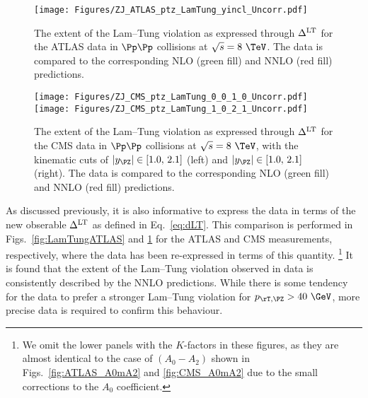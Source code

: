 \begin{figure}[ht!]
\centering
\texttt{[image: Figures/ZJ\_ATLAS\_ptz\_LamTung\_yincl\_Uncorr.pdf]}
%
\caption{\small The extent of the Lam--Tung violation as expressed through $\Delta^{\rm LT}$
for the ATLAS data in $\Pp\Pp$ collisions at $\sqrt{s} = 8~\TeV$. The data is compared to the corresponding 
NLO (green fill) and NNLO (red fill) predictions.
}
\label{fig:LamTungATLAS}
\bigskip
\texttt{[image: Figures/ZJ\_CMS\_ptz\_LamTung\_0\_0\_1\_0\_Uncorr.pdf]} \hfill
\texttt{[image: Figures/ZJ\_CMS\_ptz\_LamTung\_1\_0\_2\_1\_Uncorr.pdf]}
%
\caption{\small The extent of the Lam--Tung violation as expressed through $\Delta^{\rm LT}$
for the CMS data in $\Pp\Pp$ collisions at $\sqrt{s} = 8~\TeV$, with the kinematic cuts of 
$\lvert\yz\rvert \in [1.0,\,2.1]$ (left) and $\lvert\yz\rvert \in [1.0,\,2.1]$ (right).
The data is compared to the corresponding NLO (green fill) and NNLO (red fill) predictions.
}
\label{fig:LamTungCMS}
\end{figure}

As discussed previously, it is also informative to express the data in terms of the new obserable $\Delta^{\rm LT}$ as 
defined in Eq.~\eqref{eq:dLT}. This comparison is performed in Figs.~\ref{fig:LamTungATLAS} and \ref{fig:LamTungCMS}
for the ATLAS and CMS measurements, respectively, where the data has been re-expressed in terms of this quantity.%
\footnote{
	We omit the lower panels with the $K$-factors in these figures, as they are almost identical to the case of $(A_0-A_2)$ shown in Figs.~\ref{fig:ATLAS_A0mA2} and \ref{fig:CMS_A0mA2} due to the small corrections to the $A_0$ coefficient.
}
%
It is found that the extent of the Lam--Tung violation observed in data is consistently described
by the NNLO predictions. While there is some tendency for the data to prefer a stronger Lam--Tung 
violation for $\ptz > 40~\GeV$, more precise data is required to confirm this behaviour.
